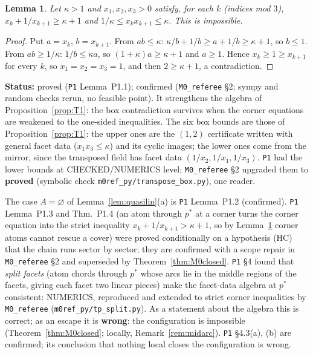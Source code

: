 \documentclass[11pt]{article}
\newtheorem{lemma}[theorem]{Lemma}
\theoremstyle{definition}
\theoremstyle{remark}
\newcommand{\src}[1]{\texttt{#1}}
\newcommand{\status}[1]{\par\smallskip\noindent\textbf{Status:} #1\par\smallskip}
\begin{document}
\begin{lemma}\label{lem:P1box}
Let $\kappa>1$ and $x_1,x_2,x_3>0$ satisfy, for each $k$ (indices mod $3$), $x_k+1/x_{k+1}\ge\kappa+1$ and $1/\kappa\le x_kx_{k+1}\le\kappa$. This is impossible.
\end{lemma}
\begin{proof}
Put $a=x_k$, $b=x_{k+1}$. From $ab\le\kappa$: $\kappa/b+1/b\ge a+1/b\ge\kappa+1$, so $b\le1$. From $ab\ge1/\kappa$: $1/b\le\kappa a$, so $(1+\kappa)a\ge\kappa+1$ and $a\ge1$. Hence $x_k\ge1\ge x_{k+1}$ for every $k$, so $x_1=x_2=x_3=1$, and then $2\ge\kappa+1$, a contradiction.
\end{proof}
\status{proved (\src{P1} Lemma~P1.1); confirmed (\src{M0\_referee} \S2; sympy and random checks rerun, no feasible point). It strengthens the algebra of Proposition~\ref{prop:T1}: the box contradiction survives when the corner equations are weakened to the one-sided inequalities. The six box bounds are those of Proposition~\ref{prop:T1}: the upper ones are the $(1,2)$ certificate written with general facet data ($x_1x_3\le\kappa$) and its cyclic images; the lower ones come from the mirror, since the transposed field has facet data $(1/x_2,1/x_1,1/x_3)$. \src{P1} had the lower bounds at CHECKED/NUMERICS level; \src{M0\_referee} \S2 upgraded them to \textbf{proved} (symbolic check \src{m0ref\_py/transpose\_box.py}), one reader.}

The case $A=\varnothing$ of Lemma~\ref{lem:quasilin}(a) is \src{P1} Lemma~P1.2 (confirmed). \src{P1} Lemma~P1.3 and Thm.~P1.4 (an atom through $p^*$ at a corner turns the corner equation into the strict inequality $x_k+1/x_{k+1}>\kappa+1$, so by Lemma~\ref{lem:P1box} corner atoms cannot rescue a cover) were proved conditionally on a hypothesis (HC) that the chain runs sector by sector; they are confirmed with a scope repair in \src{M0\_referee} \S2 and superseded by Theorem~\ref{thm:M0closed}. \src{P1} \S4 found that \emph{split facets} (atom chords through $p^*$ whose arcs lie in the middle regions of the facets, giving each facet two linear pieces) make the facet-data algebra at $p^*$ consistent: NUMERICS, reproduced and extended to strict corner inequalities by \src{M0\_referee} (\src{m0ref\_py/tp\_split.py}). As a statement about the algebra this is correct; as an escape it is \textbf{wrong}: the configuration is impossible (Theorem~\ref{thm:M0closed}; locally, Remark~\ref{rem:midarc}). \src{P1} \S4.3(a), (b) are confirmed; its conclusion that nothing local closes the configuration is wrong.
\end{document}
